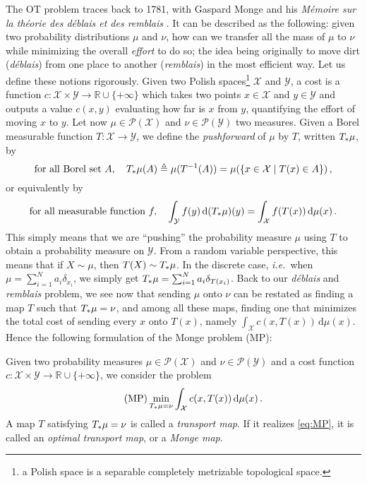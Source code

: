         The OT problem traces back to 1781, with Gaspard Monge and his \textit{Mémoire sur la théorie des déblais et des remblais} \cite{monge1781memoire}. It can be described as the following: given two probability distributions $\mu$ and $\nu$, how can we transfer all the mass of $\mu$ to $\nu$ while minimizing the overall \emph{effort} to do so; the idea being originally to move dirt (\emph{déblais}) from one place to another (\emph{remblais}) in the most efficient way. Let us define these notions rigorously. Given two Polish spaces\footnote{a Polish space is a separable completely metrizable topological space.} $\mathcal{X}$ and $\mathcal{Y}$, a cost is a function $c:\mathcal{X}\times \mathcal{Y}\to \mathbb{R}\cup \{ +\infty \}$ which takes two points $x \in \mathcal{X}$ and $y \in\mathcal{Y}$ and outputs a value $c(x,y)$ evaluating how far is $x$ from $y$, quantifying the effort of moving $x$ to $y$. Let now $\mu \in\mathcal{P}(\mathcal{X})$ and $\nu \in\mathcal{P}(\mathcal{Y})$ two measures. Given a Borel measurable function $T:\mathcal{X}\to \mathcal{Y}$, we define the \emph{pushforward} of $\mu$ by $T$, written $T_*\mu$, by
        \begin{equation}
            \text{for all Borel set }A,\quad T_*\mu(A)\triangleq \mu(T^{-1}(A))=\mu(\left\{ x \in \mathcal{X}\mid T(x)\in A\right\})\,,
        \end{equation}
        or equivalently by
        \begin{equation}
            \label{eq:pushforward-int}
            \text{for all measurable function }f,\quad \int _{\mathcal{Y}}f(y)\, \mathrm d(T_*\mu)(y)=\int _{\mathcal{X}}f(T(x))\, \mathrm d\mu(x)\,.
        \end{equation}
        This simply means that we are ``pushing'' the probability measure $\mu$ using $T$ to obtain a probability measure on $\mathcal{Y}$. From a random variable perspective, this means that if $X\sim\mu$, then $T(X)\sim T_*\mu$. In the discrete case, \textit{i.e.}~when $\mu=\sum_{i=1}^Na_{i}\delta_{x_{i}}$, we simply get $T_*\mu=\sum_{i=1}^Na_{i}\delta_{T(x_{i})}$. Back to our \emph{déblais} and \emph{remblais} problem, we see now that sending $\mu$ onto $\nu$ can be restated as finding a map $T$ such that $T_*\mu=\nu$, and among all these maps, finding one that minimizes the total cost of sending every $x$ onto $T(x)$, namely $\int _{\mathcal{X}}c(x,T(x))\, \mathrm d\mu(x)$. Hence the following formulation of the Monge problem (MP):
        \begin{defi}
            Given two probability measures $\mu \in\mathcal{P}(\mathcal{X})$ and $\nu \in\mathcal{P}(\mathcal{Y})$ and a cost function $c:\mathcal{X}\times \mathcal{Y}\to \mathbb{R}\cup \{ +\infty \}$, we consider the problem
            \begin{equation}
                \tag{MP}
                \min_{T_*\mu=\nu} \int _{\mathcal{X}}c(x,T(x))\, \mathrm d\mu(x) \,.
                \label{eq:MP}
            \end{equation}
            A map $T$ satisfying $T_*\mu=\nu$ is called a \emph{transport map}. If it realizes \cref{eq:MP}, it is called an \emph{optimal transport map}, or a \emph{Monge map}.
        \end{defi}

